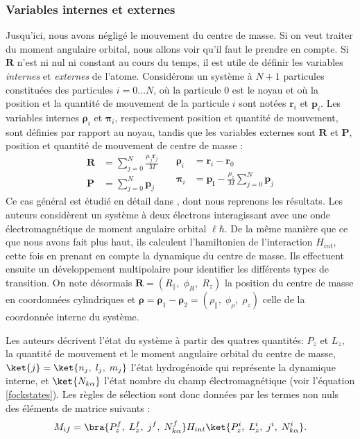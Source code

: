 \subsubsection{Variables internes et externes}
Jusqu'ici, nous avons négligé le mouvement du centre de masse. Si on veut traiter du moment angulaire orbital, nous allons voir qu'il faut le prendre en compte. Si $\bm{R}$ n'est ni nul ni constant au cours du temps, il est utile de définir les variables \textit{internes} et \textit{externes} de l'atome. Considérons un système à $N+1$ particules constituées des particules $i=0\ldots N$, où la particule $0$ est le noyau et où la position et la quantité de mouvement de la particule $i$ sont notées $\bm{r}_i$ et $\bm{p}_i$. Les variables internes $\bm{\rho}_i$ et $\bm{\pi}_i$, respectivement position et quantité de mouvement, sont définies par rapport au noyau, tandis que les variables externes sont $\bm{R}$ et $\bm{P}$, position et quantité de mouvement de centre de masse :
\begin{equation*}
\begin{split}
\bm{R} &= \sum_{j=0}^N{\frac{\mu_j \bm{r}_j}{M}}\\
\bm{P} &= \sum_{j=0}^N{\bm{p}_j}
\end{split}
\quad
\begin{split}
\bm{\rho}_i&=\bm{r}_i-\bm{r}_0\\
\bm{\pi}_i&=\bm{p_i}-\frac{\mu_i}{M}\sum_{j=0}^N{\bm{p}_j}
\end{split}
\end{equation*}
Ce cas général est étudié en détail dans , dont nous reprenons les résultats. Les auteurs considèrent un système à deux électrons interagissant avec une onde électromagnétique de moment angulaire orbital $\ell\hbar$. De la même manière que ce que nous avons fait plus haut, ils calculent l'hamiltonien de l'interaction $H_{int}$, cette fois en prenant en compte la dynamique du centre de masse. Ils effectuent ensuite un développement multipolaire pour identifier les différents types de transition. On note désormais $\bm{R} = (R_{\parallel},\;\phi_R,\;R_z)$ la position du centre de masse en coordonnées cylindriques et $\bm{\rho} = \bm{\rho}_1-\bm{\rho}_2 = (\rho_{\parallel},\;\phi_{\rho},\;\rho_z)$ celle de la coordonnée interne du système. \par
Les auteurs décrivent l'état du système à partir des quatres quantités: $P_z$ et $L_z$, la quantité de mouvement et le moment angulaire orbital du centre de masse, $\ket{j} = \ket{n_j,\;l_j,\;m_j}$ l'état hydrogénoïde qui représente la dynamique interne, et $\ket{N_{k\alpha}}$ l'état nombre du champ électromagnétique (voir l'équation \ref{fockstates}). Les règles de sélection sont donc données par les termes non nuls des éléments de matrice suivants :
\begin{equation*}
M_{if} = \bra{P^f_z,\;L^f_z,\;j^f,\;N^f_{k\alpha}}H_{int}\ket{P^i_z,\;L^i_z,\;j^i,\;N^i_{k\alpha}}.
\end{equation*}

